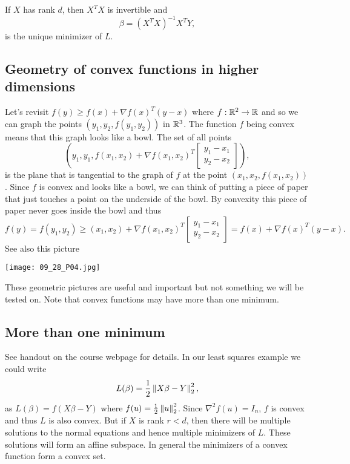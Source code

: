 If $X$ has rank $d$, then $X^TX$ is invertible and 
\[\beta = (X^TX)^{-1}X^TY, \]
is the unique minimizer of $L$.
\subsection{Geometry of convex functions in higher dimensions}
Let's revisit $f(y) \ge f(x)+\nabla f(x)^T(y-x)$ where $f:{\mathbb R}^2 \to {\mathbb R}$ and so we can graph the points $(y_1,y_2,f(y_1,y_2))$ in ${\mathbb R}^3$. The function $f$ being convex means that this graph looks like a bowl. The set of all points 
\[\left(y_1,y_1, f(x_1,x_2)+\nabla f(x_1,x_2)^T\begin{bmatrix}
    y_1-x_1\\y_2-x_2
\end{bmatrix}\right), \]
is the plane that is tangential to the graph of $f$ at the point $(x_1,x_2,f(x_1,x_2))$. Since $f$ is convex and looks like a bowl, we can think of putting a piece of paper that just touches a point on the underside of the bowl. By convexity this piece of paper never goes inside the bowl and thus
\[f(y) = f(y_1,y_2) \ge (x_1,x_2)+\nabla f(x_1,x_2)^T\begin{bmatrix}
    y_1-x_1\\y_2-x_2
\end{bmatrix} = f(x)+\nabla f(x)^T(y-x). \]
See also this picture
\begin{center}
    \texttt{[image: 09\_28\_P04.jpg]}
\end{center}
These geometric pictures are useful and important but not something we will be tested on. Note that convex functions may have more than one minimum. 

\subsection{More than one minimum}
See handout on the course webpage for details. In our least squares example we could write 
\[L(\beta) = \frac{1}{2}\left\|X \beta - Y\right\|_2^2, \]
as $L(\beta) = f(X\beta - Y)$ where $f(u) = \frac{1}{2}\left\|u\right\|_2^2$. Since $\nabla^2 f(u) = I_n$, $f$ is convex and thus $L$ is also convex. But if $X$ is rank $r < d$, then there will be multiple solutions to the normal equations and hence multiple minimizers of $L$. These solutions will form an affine subspace. In general the minimizers of a convex function form a convex set.

